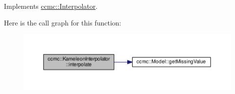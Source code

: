 Implements \hyperlink{classccmc_1_1_interpolator_ae02453da5a1a8f472f33b2058424ddb6}{ccmc\-::\-Interpolator}.



Here is the call graph for this function\-:
\nopagebreak
\begin{figure}[H]
\begin{center}
\leavevmode
\includegraphics[width=350pt]{classccmc_1_1_kameleon_interpolator_ac0f406b8da511a973a1d86409eb389d6_cgraph}
\end{center}
\end{figure}


